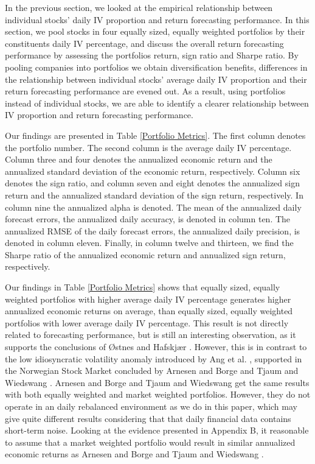 In the previous section, we looked at the empirical relationship between individual stocks' daily IV proportion and return forecasting performance. In this section, we pool stocks in four equally sized, equally weighted portfolios by their constituents daily IV percentage, and discuss the overall return forecasting performance by assessing the portfolios return, sign ratio and Sharpe ratio. By pooling companies into portfolios we obtain diversification benefits, differences in the relationship between individual stocks' average daily IV proportion and their return forecasting performance are evened out. As a result, using portfolios instead of individual stocks, we are able to identify a clearer relationship between IV proportion and return forecasting performance. 

Our findings are presented in Table \ref{Portfolio Metrics}. The first column denotes the portfolio number. The second column is the average daily IV percentage. Column three and four denotes the annualized economic return and the annualized standard deviation of the economic return, respectively. Column six denotes the sign ratio, and column seven and eight denotes the annualized sign return and the annualized standard deviation of the sign return, respectively. In column nine the annualized alpha is denoted. The mean of the annualized daily forecast errors, the annualized daily accuracy, is denoted in column ten. The annualized RMSE of the daily forecast errors, the annualized daily precision, is denoted in column eleven. Finally, in column twelve and thirteen, we find the Sharpe ratio of the annualized economic return and annualized sign return, respectively. 

Our findings in Table \ref{Portfolio Metrics} shows that equally sized, equally weighted portfolios with higher average daily IV percentage generates higher annualized economic returns on average, than equally sized, equally weighted portfolios with lower average daily IV percentage. This result is not directly related to forecasting performance, but is still an interesting observation, as it supports the conclusions of Østnes and Hafskjær \cite{ostnes}. However, this is in contrast to the low idiosyncratic volatility anomaly introduced by Ang et al. \cite{angetal06}, supported in the Norwegian Stock Market concluded by Arnesen and Borge \cite{arnborge} and Tjaum and Wiedswang \cite{thaumwiedswang}. Arnesen and Borge \cite{arnborge} and Tjaum and Wiedswang \cite{thaumwiedswang} get the same results with both equally weighted and market weighted portfolios. However, they do not operate in an daily rebalanced environment as we do in this paper, which may give quite different results considering that that daily financial data contains short-term noise. Looking at the evidence presented in Appendix B, it reasonable to assume that a market weighted portfolio would result in similar annualized economic returns as Arnesen and Borge \cite{arnborge} and Tjaum and Wiedswang \cite{thaumwiedswang}. 

